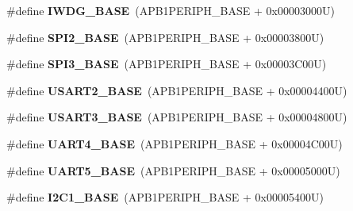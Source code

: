 \begin{DoxyCompactItemize}
\item 
\hypertarget{group___peripheral__memory__map_ga8543ee4997296af5536b007cd4748f55}{\#define {\bfseries I\-W\-D\-G\-\_\-\-B\-A\-S\-E}~(A\-P\-B1\-P\-E\-R\-I\-P\-H\-\_\-\-B\-A\-S\-E + 0x00003000\-U)}\label{group___peripheral__memory__map_ga8543ee4997296af5536b007cd4748f55}

\item 
\hypertarget{group___peripheral__memory__map_gac3e357b4c25106ed375fb1affab6bb86}{\#define {\bfseries S\-P\-I2\-\_\-\-B\-A\-S\-E}~(A\-P\-B1\-P\-E\-R\-I\-P\-H\-\_\-\-B\-A\-S\-E + 0x00003800\-U)}\label{group___peripheral__memory__map_gac3e357b4c25106ed375fb1affab6bb86}

\item 
\hypertarget{group___peripheral__memory__map_gae634fe8faa6922690e90fbec2fc86162}{\#define {\bfseries S\-P\-I3\-\_\-\-B\-A\-S\-E}~(A\-P\-B1\-P\-E\-R\-I\-P\-H\-\_\-\-B\-A\-S\-E + 0x00003\-C00\-U)}\label{group___peripheral__memory__map_gae634fe8faa6922690e90fbec2fc86162}

\item 
\hypertarget{group___peripheral__memory__map_gade83162a04bca0b15b39018a8e8ec090}{\#define {\bfseries U\-S\-A\-R\-T2\-\_\-\-B\-A\-S\-E}~(A\-P\-B1\-P\-E\-R\-I\-P\-H\-\_\-\-B\-A\-S\-E + 0x00004400\-U)}\label{group___peripheral__memory__map_gade83162a04bca0b15b39018a8e8ec090}

\item 
\hypertarget{group___peripheral__memory__map_gabe0d6539ac0026d598274ee7f45b0251}{\#define {\bfseries U\-S\-A\-R\-T3\-\_\-\-B\-A\-S\-E}~(A\-P\-B1\-P\-E\-R\-I\-P\-H\-\_\-\-B\-A\-S\-E + 0x00004800\-U)}\label{group___peripheral__memory__map_gabe0d6539ac0026d598274ee7f45b0251}

\item 
\hypertarget{group___peripheral__memory__map_ga94d92270bf587ccdc3a37a5bb5d20467}{\#define {\bfseries U\-A\-R\-T4\-\_\-\-B\-A\-S\-E}~(A\-P\-B1\-P\-E\-R\-I\-P\-H\-\_\-\-B\-A\-S\-E + 0x00004\-C00\-U)}\label{group___peripheral__memory__map_ga94d92270bf587ccdc3a37a5bb5d20467}

\item 
\hypertarget{group___peripheral__memory__map_gaa155689c0e206e6994951dc3cf31052a}{\#define {\bfseries U\-A\-R\-T5\-\_\-\-B\-A\-S\-E}~(A\-P\-B1\-P\-E\-R\-I\-P\-H\-\_\-\-B\-A\-S\-E + 0x00005000\-U)}\label{group___peripheral__memory__map_gaa155689c0e206e6994951dc3cf31052a}

\item 
\hypertarget{group___peripheral__memory__map_gacd72dbffb1738ca87c838545c4eb85a3}{\#define {\bfseries I2\-C1\-\_\-\-B\-A\-S\-E}~(A\-P\-B1\-P\-E\-R\-I\-P\-H\-\_\-\-B\-A\-S\-E + 0x00005400\-U)}\label{group___peripheral__memory__map_gacd72dbffb1738ca87c838545c4eb85a3}


\end{DoxyCompactItemize}
